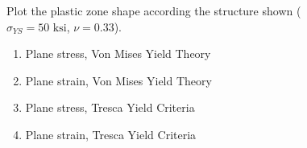 \documentclass[12pt, oneside]{article}
\begin{document}
\begin{enumerate}
\begin{figure}[H]
	\item Plot the plastic zone shape according the structure shown ($\sigma_{YS} = 50 \text{ ksi}$, $\nu = 0.33$).
	\begin{enumerate}
		\item Plane stress, Von Mises Yield Theory
		\item Plane strain, Von Mises Yield Theory
		\item Plane stress, Tresca Yield Criteria
		\item Plane strain, Tresca Yield Criteria
	\end{enumerate}
	\centering
\end{figure}

\end{enumerate}
\end{document}
